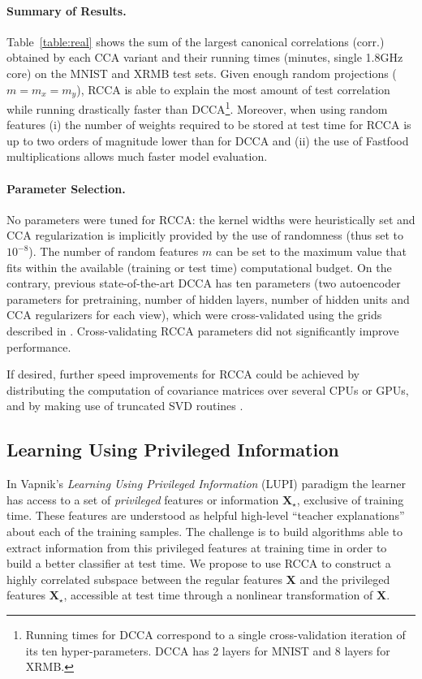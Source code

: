 \documentclass{article}
\begin{document}
  \paragraph{Summary of Results.} Table~\ref{table:real} shows the sum of the
  largest canonical correlations (corr.) obtained by each CCA variant and their
  running times (minutes, single 1.8GHz core) on the MNIST and XRMB test sets.
  Given enough random projections ($m=m_x=m_y$), RCCA is able to explain the most amount of
  test correlation while running drastically faster than
  DCCA\footnote{Running times for DCCA correspond to a single cross-validation
  iteration of its ten hyper-parameters. DCCA has 2 layers for
  MNIST and 8 layers for XRMB.}. Moreover, when using random features (i) the
  number of weights required to be stored at test time for RCCA is up to two
  orders of magnitude lower than for DCCA and (ii) the use of Fastfood
  multiplications \citep{Le13} allows much faster model evaluation.
  
  \paragraph{Parameter Selection.} No parameters were tuned for RCCA: the
  kernel widths were heuristically set and CCA regularization is implicitly 
  provided by the use of randomness (thus set to $10^{-8}$). The number of
  random features $m$ can be set to the maximum value that fits within the
  available (training or test time) computational budget. On the contrary,
  previous state-of-the-art DCCA has ten parameters (two autoencoder parameters
  for pretraining, number of hidden layers, number of hidden units and CCA
    regularizers for each view), which were cross-validated using the grids
    described in \citet{Galen13}.  Cross-validating RCCA parameters did not
    significantly improve performance.

  If desired, further speed improvements for RCCA could be achieved by
  distributing the computation of covariance matrices over several CPUs or
  GPUs, and by making use of truncated SVD routines \citep{BaglamaR06}.

  \subsection{Learning Using Privileged Information}
  \label{sec:lupi}
  In Vapnik's \emph{Learning Using Privileged Information} (LUPI) paradigm
  \citep{Vapnik09} the learner has access to a set of \emph{privileged} features
  or information $\bm X_\star$, exclusive of training time. These features are
  understood as helpful high-level ``teacher explanations'' about each of the
  training samples. The challenge is to build algorithms able to extract
  information from this privileged features at training time in order to
  build a better classifier at test time. We propose to use RCCA to construct a
  highly correlated subspace between the regular features $\bm X$ and the
  privileged features $\bm X_\star$, accessible at test time through a
  nonlinear transformation of $\bm X$.
  
\end{document}
